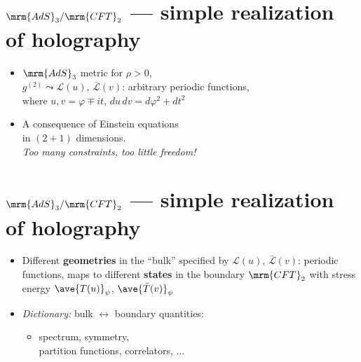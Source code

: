 \documentclass[10pt]{article}
\renewenvironment{frame}[1]%
	{\section*{#1}}%
	{\clearpage}
\newcommand{\pause}{}
\newenvironment{columns}%
	{\par\begin{minipage}{\textwidth}}%
	{\end{minipage}}
\newenvironment{column}[1]%
	{\begin{minipage}{#1}}%
	{\end{minipage}}
\begin{document}
\begin{frame}{$\mrm{AdS}_3/\mrm{CFT}_2$ --- simple realization of holography}{%
	\textcite{Banados:1992wn}
}
\begin{columns}
\figAdsCft
\begin{column}{.72\textwidth}
	\begin{itemize}
	\item $\mrm{AdS}_3$ metric for $\rho > 0$, \\
	\textcite{Banados:1998gg}
	\eqBanados
	$g^{(2)} \leadsto \mathcal L(u)$, $\bar{\mathcal L}(v)$: arbitrary periodic functions,\\
	where $u,v = \varphi \mp it$, $du\,dv = d\varphi^2 + dt^2$
	
\pause
	\item A consequence of Einstein equations \\
	in $(2+1)$ dimensions.\\
	\textit{Too many constraints, too little freedom!}
	\end{itemize}
\end{column}
\end{columns}
\end{frame}


\begin{frame}{$\mrm{AdS}_3/\mrm{CFT}_2$ --- simple realization of holography}{%
	\textcite{Aharony:1999ti}
}
\begin{columns}
\figAdsCft
\begin{column}{.72\textwidth}
	\begin{itemize}
	\item Different \textbf{geometries} in the ``bulk''
	\eqBanados
	specified by $\mathcal L(u)$, $\bar{\mathcal L}(v)$: periodic functions, maps to different \textbf{states} in the boundary $\mrm{CFT}_2$ with stress energy $\ave{T(u)}_\psi$, $\ave{\bar{T}(v)}_\psi$

	\item \textit{Dictionary:} bulk $\leftrightarrow$ boundary quantities:\\
		\begin{itemize}
		\item spectrum,
			symmetry,\\
			partition functions,
			correlators, ...
		\end{itemize}
	\end{itemize}

\end{column}
\end{columns}
\end{frame}
\end{document}

